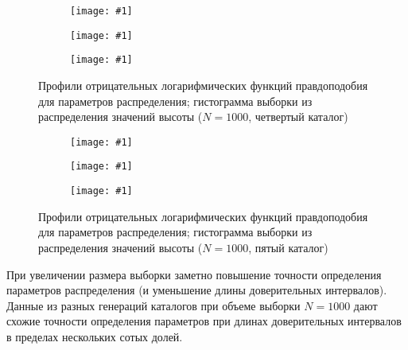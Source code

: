 \documentclass[a4paper, oneside]{article}
\newlength{\imagewidth}
\newlength{\imageheight}
\newcommand{\subgraphics}[1]{
\settowidth{\imagewidth}{\texttt{[image: \#1]}}%
\begin{subfigure}{\imagewidth}%
    \texttt{[image: \#1]}%
\end{subfigure}%
}
\begin{document}
\begin{figure}[h!]
  \centering
  \setlength{\imageheight}{4.1cm}
  \subgraphics{fit_uniform_disk/4, 1000/μ profile}
  \subgraphics{fit_uniform_disk/4, 1000/b profile}
  \subgraphics{fit_uniform_disk/4, 1000/Histogram Z}
  \caption{Профили отрицательных логарифмических функций правдоподобия для параметров распределения; гистограмма выборки из распределения значений высоты ($ N = 1000 $, четвертый каталог)}
\end{figure}

\newpage

\begin{figure}[h!]
  \centering
  \setlength{\imageheight}{4.1cm}
  \subgraphics{fit_uniform_disk/5, 1000/μ profile}
  \subgraphics{fit_uniform_disk/5, 1000/b profile}
  \subgraphics{fit_uniform_disk/5, 1000/Histogram Z}
  \caption{Профили отрицательных логарифмических функций правдоподобия для параметров распределения; гистограмма выборки из распределения значений высоты ($ N = 1000 $, пятый каталог)}
\end{figure}

При увеличении размера выборки заметно повышение точности определения параметров распределения (и уменьшение длины доверительных интервалов). Данные из разных генераций каталогов при объеме выборки $ N = 1000 $ дают схожие точности определения параметров при длинах доверительных интервалов в пределах нескольких сотых долей.
\end{document}

